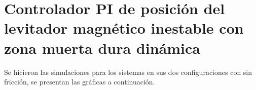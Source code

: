 \section{Controlador PI de posición del levitador magnético inestable con zona muerta dura dinámica}
Se hicieron las simulaciones para los sistemas en sus dos configuraciones con sin fricción, se presentan las gráficas a continuación.

%